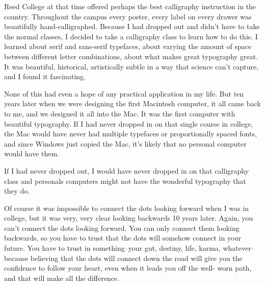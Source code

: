 \documentclass[12pt,a4paper,twocolumn]{article}
\begin{document}
Reed College at that time offered perhaps the best calligraphy instruction in the country. Throughout the campus every
poster, every label on every drawer was beautifully hand-calligraphed. Because I had dropped out and didn't have to take the
normal classes, I decided to take a calligraphy class to learn how to do this. I learned about serif and sans-serif
typefaces, about varying the amount of space between different letter combinations, about what makes great typography great.
It was beautiful, historical, artistically subtle in a way that science can't capture, and I found it fascinating.

None of this had even a hope of any practical application in my life. But ten years later when we were designing the first
Macintosh computer, it all came back to me, and we designed it all into the Mac. It was the first computer with beautiful
typography. If I had never dropped in on that single course in college, the Mac would have never had multiple typefaces or
proportionally spaced fonts, and since Windows just copied the Mac, it's likely that no personal computer would have them.

If I had never dropped out, I would have never dropped in on that calligraphy class and personals computers might not have
the wonderful typography that they do.

Of course it was impossible to connect the dots looking forward when I was in college, but it was very, very clear looking
backwards 10 years later. Again, you can't connect the dots looking forward. You can only connect them looking backwards, so
you have to trust that the dots will somehow connect in your future. You have to trust in something--your gut, destiny,
life, karma, whatever--because believing that the dots will connect down the road will give you the confidence to follow
your heart, even when it leads you off the well- worn path, and that will make all the difference.
\end{document}
